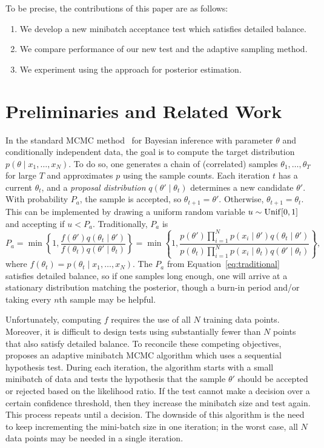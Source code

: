 \documentclass{article}
\begin{document}
To be precise, the contributions of this paper are as follows:

\begin{enumerate}[noitemsep]
    \item We develop a new minibatch acceptance test which satisfies detailed balance.
    \item We compare performance of our new test and the adaptive sampling method.
    \item We experiment using the approach for posterior estimation.
\end{enumerate}




\section{Preliminaries and Related Work}\label{sec:related_work}

In the standard MCMC method~\cite{gilks1996markov,brooks2011handbook} for Bayesian inference with
parameter $\theta$ and conditionally independent data, the goal is to compute the target
distribution $p(\theta \mid x_1, \ldots, x_N)$.  To do so, one generates a chain of (correlated)
samples $\theta_1, \ldots, \theta_T$ for large $T$ and approximates $p$ using the sample counts.
Each iteration $t$ has a current $\theta_t$, and a \emph{proposal distribution} $q(\theta' \mid
\theta_t)$ determines a new candidate $\theta'$. With probability $P_a$, the sample is accepted, so
$\theta_{t+1} = \theta'$. Otherwise, $\theta_{t+1} = \theta_t$. This can be implemented by drawing
a uniform random variable $u \sim {\rm Unif}[0,1]$ and accepting if $u < P_a$. Traditionally, $P_a$ is
\begin{equation}\label{eq:traditional}
P_a = \min\left\{ 1, \frac{f(\theta')q(\theta_t \mid \theta')}{f(\theta_t)q(\theta' \mid \theta_t)}
\right\} = \min\left\{ 1, \frac{p(\theta')\prod_{i=1}^N p(x_i \mid \theta')q(\theta_t \mid
\theta')}{p(\theta_t)\prod_{i=1}^N p(x_i \mid \theta_t)q(\theta' \mid
\theta_t)} \right\},
\end{equation}
where $f(\theta_t)=p(\theta_t \mid x_1,\ldots,x_N)$. The $P_a$ from Equation~\ref{eq:traditional}
satisfies detailed balance, so if one samples long enough, one will arrive at a stationary
distribution matching the posterior, though a burn-in period and/or taking every $n$th sample may be
helpful.

Unfortunately, computing $f$ requires the use of all $N$ training data points. Moreover, it is
difficult to design tests using substantially fewer than $N$ points that also satisfy detailed
balance. To reconcile these competing objectives,~\cite{cutting_mh_2014} proposes an adaptive
minibatch MCMC algorithm which uses a sequential hypothesis test. During each iteration, the
algorithm starts with a small minibatch of data and tests the hypothesis that the sample $\theta'$
should be accepted or rejected based on the likelihood ratio. If the test cannot make a decision
over a certain confidence threshold, then they increase the minibatch size and test again. This
process repeats until a decision.  The downside of this algorithm is the need to keep incrementing
the mini-batch size in one iteration; in the worst case, all $N$ data points may be needed in a
single iteration. 
\end{document}
